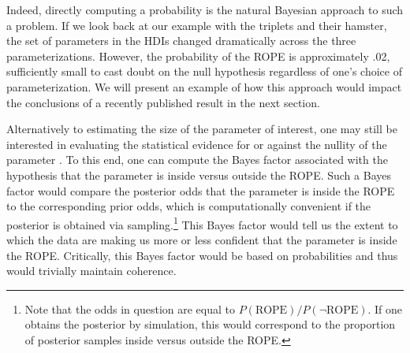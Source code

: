 \documentclass[man]{apa}
\begin{document}
Indeed, directly computing a probability is the natural Bayesian approach to such a problem. If we look back at our example with the triplets and their hamster, the set of parameters in the HDIs changed dramatically across the three parameterizations. However, the probability of the ROPE is approximately .02, sufficiently small to cast doubt on the null hypothesis regardless of one's choice of parameterization.  We will present an example of how this approach would impact the conclusions of a recently published result in the next section.



Alternatively to estimating the size of the parameter of interest, one may still be interested in evaluating the statistical evidence for or against the nullity of the parameter%
. To this end, one can compute the Bayes factor associated with the hypothesis that the parameter is inside versus outside the ROPE. Such a Bayes factor would compare the posterior odds that the parameter is inside the ROPE to the corresponding prior odds, which is computationally convenient if the posterior is obtained via sampling.\footnote{Note that the odds in question are equal to $P(\text{ROPE})/P(\lnot \text{ROPE})$. If one obtains the posterior by simulation, this would correspond to the proportion of posterior samples inside versus outside the ROPE.} This Bayes factor would tell us the extent to which the data are making us more or less confident that the parameter is inside the ROPE. Critically, this Bayes factor would be based on probabilities and thus would trivially maintain coherence.
\end{document}
